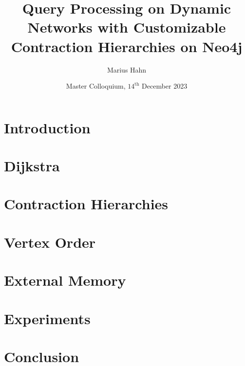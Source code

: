 \documentclass[xcolor={dvipsnames}]{beamer}
\title[CCH in Neo4j] %
{Query Processing on Dynamic Networks with Customizable Contraction Hierarchies on Neo4j}
\author[Marius Hahn] %
{Marius Hahn}
\institute[CIS] %
{
  Grouf of Database and Information Systems \\
  Department of Computer and Information Science \\
  Faculty of Sciences \\
  Universität Konstanz
}
\date[$\text{14}^{\text{th}}$ December 2023] %
{Master Colloquium, $\text{14}^{\text{th}}$ December 2023}
\begin{document}
\frame{\titlepage}



\section{Introduction}



\section{Dijkstra}
%

\section{Contraction Hierarchies}






\section{Vertex Order}




\section{External Memory}







\section{Experiments}










\section{Conclusion}

\end{document}
